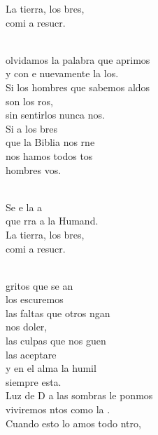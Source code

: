 \documentclass[12pt]{article}
\begin{document}
\begin{multicols*}{2}
\begin{cancion}
\begin{chorus}
	La tierra, los bres,\\
	comi a resucr.\\
	\end{chorus}%
	\jump\\
	olvidamos la palabra que aprimos\\
	y con e nuevamente la los.\\
	Si los hombres que sabemos aldos\\
	son los ros, \\
	sin sentirlos nunca nos.\\
	Si a los bres \\
	que la Biblia nos rne \\
	nos hamos todos tos \\
	hombres vos.\\\jump\\
	\begin{chorus}%
	Se e la a\\
	que rra a la Humand.\\
	La tierra, los bres,\\
	comi a resucr.\\
	\end{chorus}%
	\jump\\
	 gritos que se an \\
	los escuremos\\
	las faltas que otros ngan \\
	nos doler,\\
	las culpas que nos guen \\
	las aceptare\\
	y en el alma la humil \\
	siempre esta.\\
	Luz de D a las sombras le ponmos\\
	viviremos ntos como la .\\
	Cuando esto lo amos todo ntro,\\

\end{cancion}
\end{multicols*}
\end{document}
